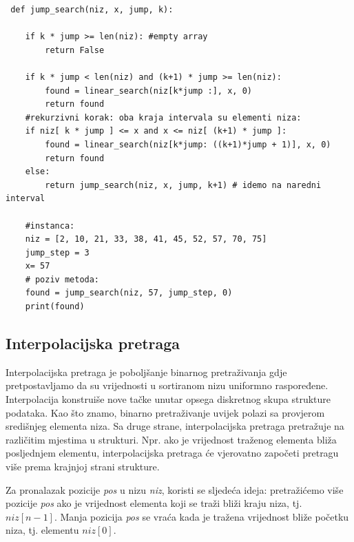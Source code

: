  \begin{verbatim}
 def jump_search(niz, x, jump, k):
 
 	if k * jump >= len(niz): #empty array
 		return False
 
 	if k * jump < len(niz) and (k+1) * jump >= len(niz): 
 		found = linear_search(niz[k*jump :], x, 0)
 		return found
 	#rekurzivni korak: oba kraja intervala su elementi niza: 
 	if niz[ k * jump ] <= x and x <= niz[ (k+1) * jump ]:
 		found = linear_search(niz[k*jump: ((k+1)*jump + 1)], x, 0)
 		return found
 	else:
 		return jump_search(niz, x, jump, k+1) # idemo na naredni interval
 
 	#instanca:
 	niz = [2, 10, 21, 33, 38, 41, 45, 52, 57, 70, 75]
 	jump_step = 3
 	x= 57
 	# poziv metoda:
 	found = jump_search(niz, 57, jump_step, 0)
 	print(found) 
 \end{verbatim}

\subsection{Interpolacijska pretraga}


 Interpolacijska pretraga je poboljšanje  binarnog pretraživanja   gdje pretposta\-vljamo da su vrijednosti u sortiranom nizu uniformno  raspo\-ređene. Interpo\-lacija konstruiše nove tačke   unutar opsega diskretnog skupa strukture pod\-ataka. Kao što znamo, binarno pretraživanje uvijek polazi sa provjerom središnjeg elementa niza. Sa druge strane, interpolacijska pretraga  pretražuje na različitim mjestima u strukturi. Npr. ako je vrijednost traženog elementa  bliža posljednjem elementu, interpolacijska pretraga će vjerovatno započeti pretragu više prema krajnjoj strani strukture.
  
  Za pronalazak pozicije  \emph{pos} u nizu \emph{niz}, koristi se sljedeća ideja: pretra\-žićemo više pozicije \emph{pos} ako je vrijednost elementa koji se traži bliži kraju niza, tj. $niz[n-1]$. Manja pozicija \emph{pos} se vraća kada je tražena vrijednost bliže početku niza, tj. elementu $niz[0]$. 
  
